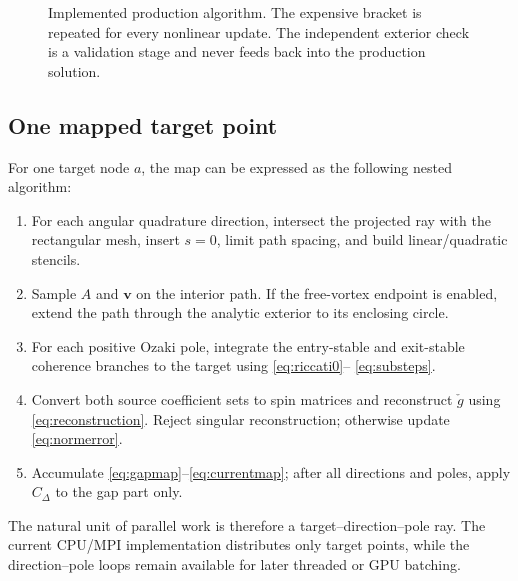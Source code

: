 \documentclass[11pt,a4paper]{article}
\begin{document}
\begin{landscape}
\begin{figure}[p]
{
}
\caption{Implemented production algorithm.  The expensive bracket is repeated
for every nonlinear update.  The independent exterior check is a validation
stage and never feeds back into the production solution.}
\label{fig:algorithm-flow}
\end{figure}
\end{landscape}

\subsection{One mapped target point}

For one target node $a$, the map can be expressed as the following nested
algorithm:
\begin{enumerate}
  \item For each angular quadrature direction, intersect the projected ray
  with the rectangular mesh, insert $s=0$, limit path spacing, and build linear/quadratic
  stencils.
  \item Sample $A$ and $\bm v$ on the interior path.  If the free-vortex
  endpoint is enabled, extend the path through the analytic exterior to its
  enclosing circle.
  \item For each positive Ozaki pole, integrate the entry-stable and
  exit-stable coherence branches to the target using \eqref{eq:riccati0}--
  \eqref{eq:substeps}.
  \item Convert both source coefficient sets to spin matrices and reconstruct
  $\check g$ using \eqref{eq:reconstruction}.  Reject singular reconstruction;
  otherwise update \eqref{eq:normerror}.
  \item Accumulate \eqref{eq:gapmap}--\eqref{eq:currentmap}; after all
  directions and poles, apply $C_\Delta$ to the gap part only.
\end{enumerate}

The natural unit of parallel work is therefore a target--direction--pole ray.
The current CPU/MPI implementation distributes only target points, while the
direction--pole loops remain available for later threaded or GPU batching.
\end{document}
